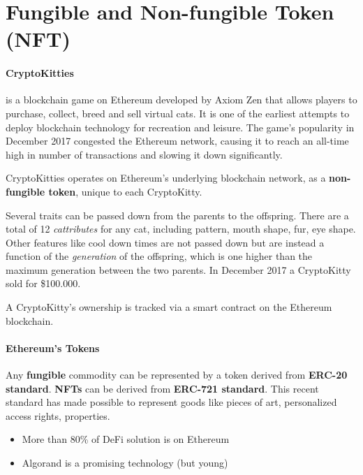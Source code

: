 \section{Fungible and Non-fungible Token (NFT)}


\paragraph{CryptoKitties} is a blockchain game on Ethereum developed by Axiom Zen that allows players to purchase, collect, breed and sell virtual cats. It is one of the earliest attempts to deploy blockchain technology for recreation and leisure. The game's popularity in December 2017 congested the Ethereum network, causing it to reach an all-time high in number of transactions and slowing it down significantly.

CryptoKitties operates on Ethereum's underlying blockchain network, as a \textbf{non-fungible token}, unique to each CryptoKitty.

Several traits can be passed down from the parents to the offspring. There are a total of 12 \emph{cattributes} for any cat, including pattern, mouth shape, fur, eye shape. Other features like cool down times are not passed down but are instead a function of the \emph{generation} of the offspring, which is one higher than the maximum generation between the two parents. In December 2017 a CryptoKitty sold for \$100.000.

A CryptoKitty's ownership is tracked via a smart contract on the Ethereum blockchain.

\paragraph{Ethereum's Tokens} Any \textbf{fungible} commodity can be represented by a token derived from \textbf{ERC-20 standard}. \textbf{NFTs} can be derived from \textbf{ERC-721 standard}. This recent standard has made possible to represent goods like pieces of art, personalized access rights, properties.

\begin{itemize}
	\item More than 80\% of DeFi solution is on Ethereum
	\item Algorand is a promising technology (but young)
\end{itemize}


